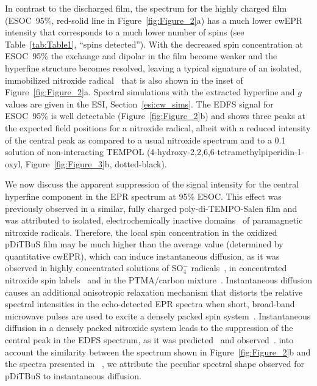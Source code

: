 
In contrast to the discharged film, the spectrum for the highly charged film (ESOC~95\%, red-solid line in Figure~\ref{fig:Figure_2}a) has a much lower cwEPR intensity that corresponds to a much lower number of spins (see Table~\ref{tab:Table1}, ``spins detected''). With the decreased spin concentration at ESOC~95\%\rs{,} the exchange and dipolar  in the film become weaker and the hyperfine structure becomes resolved, leaving a typical signature of an isolated, immobilized nitroxide radical~\cite{Bordignon2017} that is also shown in the inset of Figure~\ref{fig:Figure_2}a. Spectral simulations with the extracted hyperfine and  $g$ values are given in the ESI, Section~\ref{esi:cw_sims}. The EDFS signal for ESOC~95\% is well detectable (Figure~\ref{fig:Figure_2}b) and shows three peaks at the expected field positions for a nitroxide radical, albeit with a reduced intensity of the central peak as compared to a usual nitroxide spectrum\cite{Bordignon2017} and to a 0.1~\si{\milli\Molar} solution of non-interacting TEMPOL (4-hydroxy-2,2,6,6-tetramethylpiperidin-1-oxyl, Figure~\ref{fig:Figure_3}b, dotted-black).

We now discuss the apparent suppression of the signal intensity for the central hyperfine component in the EPR spectrum at 95\% ESOC. This effect was previously observed in a similar, fully charged poly-di-TEMPO-Salen film and was attributed to isolated, electrochemically inactive domains~\cite{Kulikov2022} of paramagnetic nitroxide radicals. Therefore, the local spin concentration in the oxidized pDiTBuS film may be much higher than the average value (determined by quantitative cwEPR), which can induce instantaneous diffusion\cite{Salikhov1981,Toropov1998,Schweiger2001}, as it was observed in highly concentrated solutions of SO$_4^{-}$ radicals~\cite{Salikhov1981}, in concentrated nitroxide spin labels~\cite{Toropov1998} and in the PTMA/carbon mixture~\cite{Daniel2023}. Instantaneous diffusion causes an additional anisotropic relaxation mechanism that distorts the relative spectral intensities in the echo-detected EPR spectra when short, broad-band microwave pulses are used to excite a densely packed spin system~\cite{Salikhov1981}. Instantaneous diffusion in a densely packed nitroxide system leads to the suppression of the central peak in the EDFS spectrum, as it was predicted~\cite{Salikhov1981} and observed~\cite{Toropov1998,Daniel2023}.  into account the similarity between the spectrum shown in Figure~\ref{fig:Figure_2}b and the spectra presented in ~\cite{Daniel2023}, we attribute the peculiar spectral shape observed for pDiTBuS to instantaneous diffusion.


